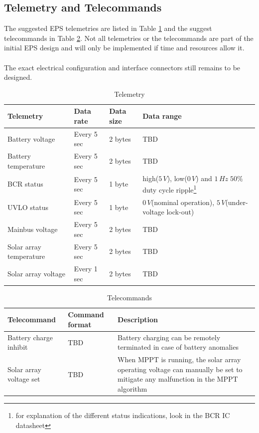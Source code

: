 \subsection{Telemetry and Telecommands}
The suggested \ac{EPS} telemetries are listed in Table \ref{tab:Telemetry} and the suggest telecommands in Table \ref{tab:Telecommands}. Not all telemetries or the telecommands are part of the initial \ac{EPS} design and will only be implemented if time and resources allow it.
\\
\\
The exact electrical configuration and interface connectors still remains to be designed.
%
\begin{table}[H]
\centering
\caption{Telemetry}
\label{tab:Telemetry}
\begin{tabular}{|p{}p{}p{}p{}|}
\hline
\textbf{Telemetry} & \textbf{Data rate} & \textbf{Data size} & \textbf{Data range}\\
\hline
Battery voltage & Every 5 sec & 2 bytes & \ac{TBD}\\
\hline
Battery temperature & Every 5 sec & 2 bytes & \ac{TBD}\\
\hline
BCR status & Every 5 sec & 1 byte & high($5\,V$), low($0\,V$) and $1\,Hz\;50\%$ duty cycle ripple\footnote{for explanation of the different status indications, look in the \ac{BCR} \ac{IC} datasheet}\\
\hline
\ac{UVLO} status & Every 5 sec & 1 byte &  $0\,V$(nominal operation), $5\,V$(under-voltage lock-out)\\
\hline
Mainbus voltage & Every 5 sec & 2 bytes & \ac{TBD}\\
\hline
Solar array temperature & Every 5 sec & 2 bytes & \ac{TBD}\\
\hline
Solar array voltage & Every 1 sec & 2 bytes & \ac{TBD}\\
\hline
\end{tabular}
\end{table}
%
\begin{table}[H]
\centering
\caption{Telecommands}
\label{tab:Telecommands}
\begin{tabular}{|p{}p{}p{}|}
\hline
\textbf{Telecommand} & \textbf{Command format} & \textbf{Description}\\
\hline
Battery charge inhibit & \ac{TBD} & Battery charging can be remotely terminated in case of battery anomalies\\
\hline
Solar array voltage set & \ac{TBD} & When \ac{MPPT} is running, the solar array operating voltage can manually be set to mitigate any malfunction in the \ac{MPPT} algorithm\\
\hline
\end{tabular}
\end{table}

